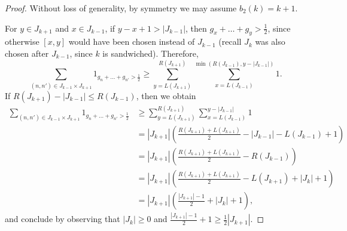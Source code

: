 \documentclass[12pt]{amsart}
\theoremstyle{definition}
\begin{document}
\begin{proof}
Without loss of generality, by symmetry we may assume $b_2(k) = k+1$.

\vspace{1.5mm}

For $y \in J_{k+1}$ and $x \in J_{k-1}$, if $y-x+1 > |J_{k-1}|$, then $g_x+\dots+g_y > \frac{1}{2}$, since otherwise $[x,y]$ would have been chosen instead of $J_{k-1}$ (recall $J_k$ was also chosen after $J_{k-1}$, since $k$ is sandwiched). Therefore, $$\sum_{(n,n') \in J_{k-1}\times J_{k+1}} 1_{g_n+\dots+g_{n'} > \frac{1}{2}} \ge \sum_{y=L(J_{k+1})}^{R(J_{k+1})} \sum_{x = L(J_{k-1})}^{\min(R(J_{k-1}),y-|J_{k-1}|)} 1.$$ If $R(J_{k+1})-|J_{k-1}| \le R(J_{k-1})$, then we obtain \begin{align*} \sum_{(n,n') \in J_{k-1}\times J_{k+1}} 1_{g_n+\dots+g_{n'} > \frac{1}{2}} &\ge \sum_{y = L(J_{k+1})}^{R(J_{k+1})} \sum_{x = L(J_{k-1})}^{y-|J_{k-1}|} 1 \\ &= |J_{k+1}|\left(\frac{R(J_{k+1})+L(J_{k+1})}{2}-|J_{k-1}|-L(J_{k-1})+1\right) \\ &= |J_{k+1}|\left(\frac{R(J_{k+1})+L(J_{k+1})}{2}-R(J_{k-1})\right) \\ &= |J_{k+1}|\left(\frac{R(J_{k+1})+L(J_{k+1})}{2}-L(J_{k+1})+|J_k|+1\right) \\ &= |J_{k+1}|\left(\frac{|J_{k+1}|-1}{2}+|J_k|+1\right), \end{align*} and conclude by observing that $|J_k| \ge 0$ and $\frac{|J_{k+1}|-1}{2}+1 \ge \frac{1}{2}|J_{k+1}|$.

\vspace{2mm}


\end{proof}
\end{document}
